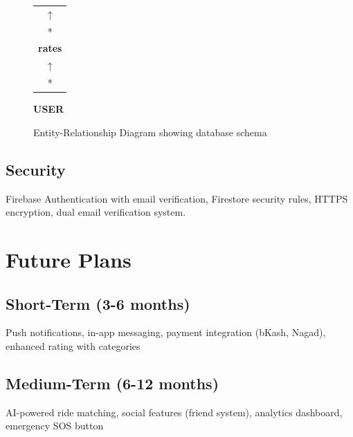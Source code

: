\documentclass[12pt,a4paper]{article}
\begin{document}
\begin{figure}[H]
{{        
        \hspace{1cm}
        \begin{tabular}{c}
        $\uparrow$\\
        *\\
        \textbf{rates}\\
        $\uparrow$\\
        *
        \end{tabular}
        \hspace{1cm}
        \textbf{USER}
    }}
    \caption{Entity-Relationship Diagram showing database schema}
    \label{fig:erdiagram}
\end{figure}

\subsection{Security}

Firebase Authentication with email verification, Firestore security rules, HTTPS encryption, dual email verification system.

\section{Future Plans}

\subsection{Short-Term (3-6 months)}
Push notifications, in-app messaging, payment integration (bKash, Nagad), enhanced rating with categories

\subsection{Medium-Term (6-12 months)}
AI-powered ride matching, social features (friend system), analytics dashboard, emergency SOS button
\end{document}
